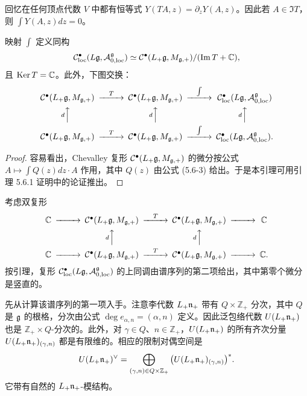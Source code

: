 回忆在任何顶点代数 $V$ 中都有恒等式 $Y(TA,z) = \partial_zY(A,z)$。因此若 $A\in\Im T$，则 $\int Y(A,z)dz = 0$。

\begin{lemma}
映射 $\int$ 定义同构
\[
\mathcal{C}^\bullet_{\mathrm{loc}}(L\mathfrak{g},\mathcal{A}^{\mathfrak{g}}_{0,\mathrm{loc}})\simeq \mathcal{C}^\bullet(L_+\mathfrak{g},M_{\mathfrak{g},+})/(\operatorname{Im} T+\mathbb{C}),
\]
且 $\operatorname{Ker}T = \mathbb{C}$。此外，下图交换：
\[
\begin{CD}
\cC^\bullet(L_+\fg,M_{\fg,+}) @>T>> \cC^\bullet(L_+\fg,M_{\fg,+}) @>\int>> \cC^\bullet_{\mathrm{loc}}(L\fg,\cA^{\fg}_{0,\mathrm{loc}})\\
@AdAA @AdAA @AdAA\\
\cC^\bullet(L_+\fg,M_{\fg,+}) @>T>> \cC^\bullet(L_+\fg,M_{\fg,+}) @>\int>> \cC^\bullet_{\mathrm{loc}}(L\fg,\cA^{\fg}_{0,\mathrm{loc}}).
\end{CD}
\]
\end{lemma}

\begin{proof}
容易看出，Chevalley 复形 $\mathcal{C}^\bullet(L_+\mathfrak{g},M_{\mathfrak{g},+})$ 的微分按公式 $A\mapsto\int Q(z)dz\cdot A$ 作用，其中 $Q(z)$ 由公式 (5.6-3) 给出。于是本引理可用引理 5.6.1 证明中的论证推出。
\end{proof}

考虑双复形
\[
\begin{CD}
\C @>>> \cC^\bullet(L_+\fg,M_{\fg,+}) @>T>> \cC^\bullet(L_+\fg,M_{\fg,+}) @>>> \C\\
@. @AdAA @AdAA @.\\
\C @>>> \cC^\bullet(L_+\fg,M_{\fg,+}) @>T>> \cC^\bullet(L_+\fg,M_{\fg,+}) @>>> \C.
\end{CD}
\]
按引理，复形 $\mathcal{C}^\bullet_{\mathrm{loc}}(L\mathfrak{g},\mathcal{A}^{\mathfrak{g}}_{0,\mathrm{loc}})$ 的上同调由谱序列的第二项给出，其中第零个微分是竖直的。

先从计算该谱序列的第一项入手。注意李代数 $L_+\mathfrak{n}_+$ 带有 $Q\times\mathbb{Z}_+$ 分次，其中 $Q$ 是 $\mathfrak{g}$ 的根格，分次由公式 $\deg e_{\alpha,n} = (\alpha,n)$ 定义。因此泛包络代数 $U(L_+\mathfrak{n}_+)$ 也是 $\mathbb{Z}_+\times Q$-分次的。此外，对 $\gamma\in Q$、$n\in\mathbb{Z}_+$，$U(L_+\mathfrak{n}_+)$ 的所有齐次分量 $U(L_+\mathfrak{n}_+){}_{(\gamma,n)}$ 都是有限维的。相应的限制对偶空间是
\[
U(L_+\mathfrak{n}_+)^\vee = \bigoplus_{(\gamma,n)\in Q\times\mathbb{Z}_+}\big(U(L_+\mathfrak{n}_+)_{(\gamma,n)}\big)^*.
\]
它带有自然的 $L_+\mathfrak{n}_+$-模结构。

